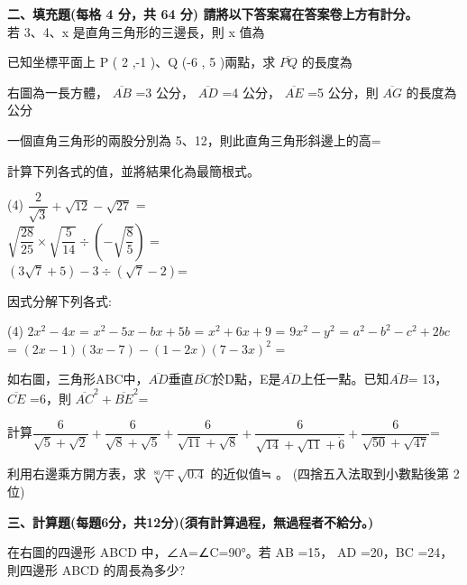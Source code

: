 \documentclass
[answers]
{exam}
\newcommand\ul[1]{\uline{\hspace*{#1}}}
\theoremstyle{definition}
\begin{document}
\begin{questions}
\textbf{二、填充題(每格 4 分，共 64 分)  請將以下答案寫在答案卷上方有計分。}\\

\question
若 3、4、x 是直角三角形的三邊長，則 x 值為\ul{50pt}

\question
已知坐標平面上 P ( 2 ,-1 )、Q (-6 , 5 )兩點，求 $\overline{PQ}$ 的長度為
\ul{50pt}

\question
右圖為一長方體， $\overline{AB}$ =3 公分， $\overline{AD}$ =4 公分， $\overline{AE}$ =5 公分，則 $\overline{AG}$ 的長度為
\ul{50pt}
公分

\question
一個直角三角形的兩股分別為 5、12，則此直角三角形斜邊上的高= 
\ul{50pt}

\question
計算下列各式的值，並將結果化為最簡根式。
\begin{tasks}(4)
	\task $\dfrac{2}{\sqrt{3}}+\sqrt{12}-\sqrt{27}$ = \ul{50pt}\\
	\task $\sqrt{\dfrac{28}{25}}\times\sqrt{\dfrac{5}{14}}\div\left(-\sqrt{\dfrac{8}{5}}\right)$ = \ul{50pt}\\
	\task $\left(3\sqrt{7}+5\right)-3\div\left(\sqrt{7}-2\right)$= \ul{50pt}\\
	

\end{tasks}

\question
因式分解下列各式:
\begin{tasks}(4)
	\task $2x^2-4x$ = \ul{50pt}
	\task $x^2-5x-bx+5b$ = \ul{50pt}
	\task $x^2+6x+9$ = \ul{50pt}
	\task $9x^2-y^2$ = \ul{50pt}
	\task $a^2-b^2-c^2+2bc$ = \ul{50pt}
	\task $\left(2x-1\right)\left(3x-7\right)-\left(1-2x\right)\left(7-3x\right)^2$ = \ul{50pt}
\end{tasks}

\question
如右圖，三角形ABC中，$\overline{AD}$垂直$\overline{BC}$於D點，E是$\overline{AD}$上任一點。已知$\overline{AB}$= 13， $\overline{CE}$ =6，則 $\overline{AC}^2+ \overline{BE}^2$=
\ul{50pt}

\question

計算$\dfrac{6}{\sqrt{5}+\sqrt{2}}+\dfrac{6}{\sqrt{8}+\sqrt{5}}+\dfrac{6}{\sqrt{11}+\sqrt{8}}+\dfrac{6}{\sqrt{14}+\sqrt{11}+\dot{6}}+\dfrac{6}{\sqrt{50}+\sqrt{47}}$=
\ul{50pt}

\question
利用右邊乘方開方表，求 $\sqrt[80]+\sqrt{0.4}$ 的近似值≒   。\ul{50pt} (四捨五入法取到小數點後第 2 位)


\textbf{三、計算題(每題6分，共12分)(須有計算過程，無過程者不給分。)}

\question
在右圖的四邊形 ABCD 中，∠A=∠C=90°。若 AB =15， AD =20，BC =24，則四邊形 ABCD 的周長為多少?


\end{questions}
\end{document}
